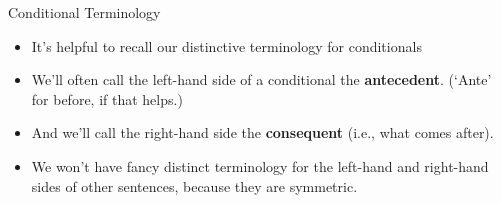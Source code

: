 \documentclass[
  ignorenonframetext,
]{beamer}
\providecommand{\tightlist}{%
  \setlength{\itemsep}{0pt}\setlength{\parskip}{0pt}}
\renewcommand{\,}{\text{, }}
\begin{document}
\begin{frame}{Conditional Terminology}
\protect\hypertarget{conditional-terminology}{}

\begin{itemize}
\tightlist
\item
  It's helpful to recall our distinctive terminology for conditionals
\item
  We'll often call the left-hand side of a conditional the
  \textbf{antecedent}. (`Ante' for before, if that helps.) \pause
\item
  And we'll call the right-hand side the \textbf{consequent} (i.e., what
  comes after).
\item
  We won't have fancy distinct terminology for the left-hand and
  right-hand sides of other sentences, because they are symmetric.
\end{itemize}

\end{frame}
\end{document}
